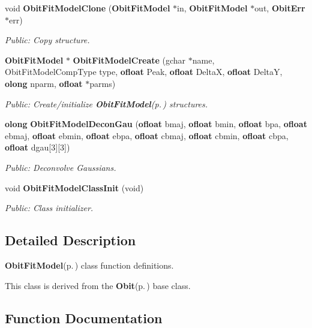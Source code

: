 \begin{CompactItemize}
void {\bf Obit\-Fit\-Model\-Clone} ({\bf Obit\-Fit\-Model} $\ast$in, {\bf Obit\-Fit\-Model} $\ast$out, {\bf Obit\-Err} $\ast$err)
\begin{CompactList}\small\item\em Public: Copy structure. \item\end{CompactList}\item 
{\bf Obit\-Fit\-Model} $\ast$ {\bf Obit\-Fit\-Model\-Create} (gchar $\ast$name, Obit\-Fit\-Model\-Comp\-Type type, {\bf ofloat} Peak, {\bf ofloat} Delta\-X, {\bf ofloat} Delta\-Y, {\bf olong} nparm, {\bf ofloat} $\ast$parms)
\begin{CompactList}\small\item\em Public: Create/initialize {\bf Obit\-Fit\-Model}{\rm (p.\,\pageref{structObitFitModel})} structures. \item\end{CompactList}\item 
{\bf olong} {\bf Obit\-Fit\-Model\-Decon\-Gau} ({\bf ofloat} bmaj, {\bf ofloat} bmin, {\bf ofloat} bpa, {\bf ofloat} ebmaj, {\bf ofloat} ebmin, {\bf ofloat} ebpa, {\bf ofloat} cbmaj, {\bf ofloat} cbmin, {\bf ofloat} cbpa, {\bf ofloat} dgau[3][3])
\begin{CompactList}\small\item\em Public: Deconvolve Gaussians. \item\end{CompactList}\item 
void {\bf Obit\-Fit\-Model\-Class\-Init} (void)
\begin{CompactList}\small\item\em Public: Class initializer. \item\end{CompactList}\end{CompactItemize}


\subsection{Detailed Description}
{\bf Obit\-Fit\-Model}{\rm (p.\,\pageref{structObitFitModel})} class function definitions. 

This class is derived from the {\bf Obit}{\rm (p.\,\pageref{structObit})} base class.

\subsection{Function Documentation}
